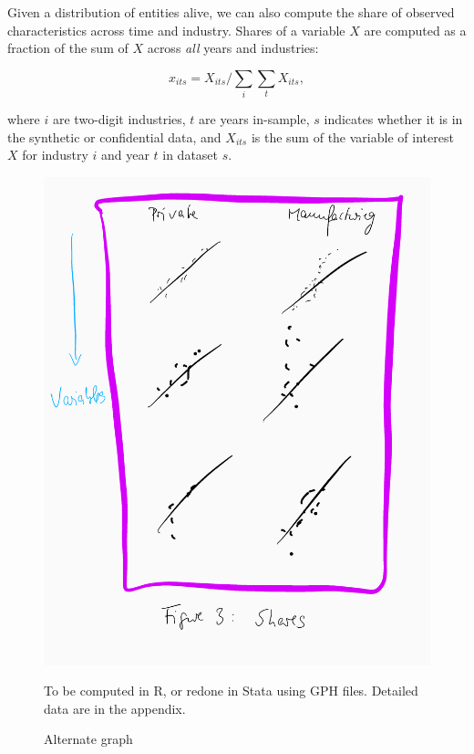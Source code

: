 Given a distribution of entities alive, we can also compute the share of observed characteristics across time and industry. Shares of a variable $X$ are computed as a fraction of the sum of $X$ across \textit{all} years and industries:

\begin{equation}
    \label{eq:share_employment}
x_{its} = X_{its}/\sum_{i} \sum_{t} X_{its}, 
\end{equation}

where $i$ are two-digit industries, $t$ are  years in-sample, $s$ indicates whether it is in the synthetic or confidential data, and $X_{its}$ is the sum of the variable of interest $X$ for industry $i$ and year $t$ in  dataset $s$.

\begin{figure} [H]
\centering
\label{tab:all:shares}
\includegraphics[width=.8\linewidth]{graphs/Figure3-placeholder.png} 
\caption{Alternate graph} 
\begin{minipage}{0.48\linewidth}
{\footnotesize To be computed in R, or redone in Stata using GPH files. Detailed data are in the appendix. \par}
\end{minipage}
\end{figure}


